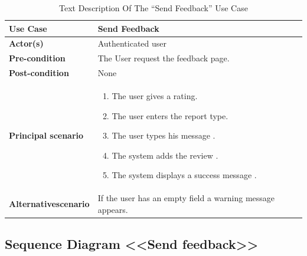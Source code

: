 \begin{table}[H]
    \renewcommand{\arraystretch}{1.5}
    
   \begin{tabular}{|p{}|p{}|}
   \hline
     
        \textbf{Use Case} & Send Feedback  \\   \hline
        
        \textbf{Actor(s) } &  Authenticated user   \\   \hline
        \textbf{Pre-condition} & 
           The User request the feedback page.
         
        \\  \hline
        \textbf{Post-condition} & None \\   \hline


                \textbf{Principal scenario} &
                \begin{enumerate}[left=0pt]
                    \item The user gives a rating.
                    \item The user enters the report type.
                    \item The user types his message .
                    \item The system adds the review .
                    \item The system displays a success message .
                
                    \end{enumerate}  \\   \hline

                     \textbf{Alternative\newline scenario} & 
            If the user has an empty field a warning message appears.
        \\   \hline
       
\end{tabular}

     \caption{Text Description Of The “Send Feedback” Use Case}
    \label{tab:my_label}
    
\end{table}

\newpage

\subsection{Sequence Diagram <<Send feedback>> }



